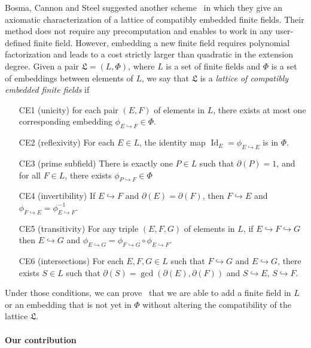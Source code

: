 \documentclass[12pt]{article}
\DeclareMathOperator{\Id}{Id}
\newcommand{\dE}{\partial(E)}
\newcommand{\dF}{\partial(F)}
\newcommand{\emb}{\hookrightarrow}
\newcommand{\embed}[2]{\phi_{#1\hookrightarrow#2}}
\begin{document}
Bosma, Cannon and Steel suggested another scheme~\cite{BCS97} in which they
give an axiomatic characterization of a lattice of compatibly embedded finite
fields. Their method does not require any precomputation and enables to work in
any user-defined finite field. However, embedding a new finite field requires
polynomial factorization and leads to a cost strictly larger than quadratic in the extension degree.
Given a pair $\mathfrak L=(L, \Phi)$, where
$L$ is a set of finite fields and $\Phi$ is a set of embeddings between
elements of $L$, we say that $\mathfrak L$ is a \emph{lattice of compatibly
embedded finite fields} if
\begin{enumerate}
  \item[CE1] (unicity) for each pair $(E, F)$ of elements in $L$, there exists
    at most one corresponding embedding $\embed{E}{F}\in\Phi$.
  \item[CE2] (reflexivity) For each $E\in L$, the identity map
    $\Id_E=\embed{E}{E}$ is in $\Phi$.
  \item[CE3] (prime subfield) There is exactly one $P\in L$ such that $\partial
    (P) = 1$, and for all $F\in L$, there exists $\embed{P}{F}\in\Phi$
  \item[CE4] (invertibility) If $E\emb F$ and $\dE=\dF$, then $F\emb E$ and
    $\embed{F}{E}=\embed{E}{F}^{-1}$.
  \item[CE5] (transitivity) For any triple $(E, F, G)$ of elements in $L$, if $E\emb
    F\emb G$ then $E\emb G$ and
    $\embed{E}{G}=\embed{F}{G}\circ\embed{E}{F}$.
  \item[CE6](intersections) For each $E, F, G\in L$ such that $F\emb G$ and
    $E\emb G$, there exists $S\in L$ such that $\partial(S)=\gcd(\dE, \dF)$
    and $S\emb E$, $S\emb F$.
\end{enumerate}

Under those conditions, we can prove~\cite{BCS97} that we are able to add a
finite field in
$L$ or an embedding that is not yet in $\Phi$ without altering the compatibility
of the lattice $\mathfrak L$.

\paragraph{Our contribution}
\end{document}
